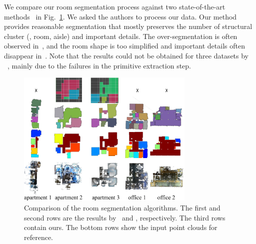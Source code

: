 We compare our room segmentation process against two state-of-the-art
methods~\cite{Mura2014,Turner2015} in Fig.~\ref{fig:result_all}.  We
asked the authors to process our data. Our method provides reasonable
segmentation that mostly preserves the number of structural cluster
(\eg, room, aisle) and important details.
The over-segmentation is often observed in~\cite{Turner2015}, and the
room shape is too simplified and important details often disappear
in~\cite{Mura2014}. Note that the results could not be obtained for
three datasets by ~\cite{Mura2014}, mainly due to the failures in the
primitive extraction step.
\begin{figure}[!t]
\begin{center}
\includegraphics[width=85mm]{../figures/result_all.pdf}
\end{center}
 \vspace{-0.2cm}
\caption{Comparison of the room segmentation algorithms. The first and
second rows are the results by~\cite{Mura2014} and
\cite{Turner2015}, respectively. The third rows contain ours. The bottom
 rows show the input point clouds for reference.}  \label{fig:result_all}
 \vspace{-0.25cm}
\end{figure}





